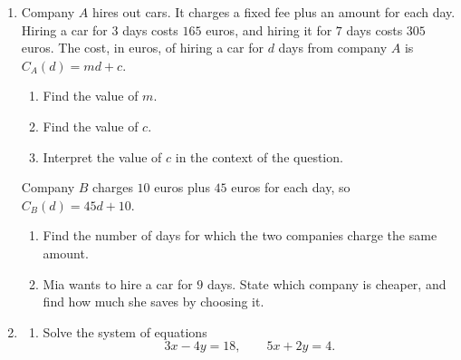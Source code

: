\documentclass[12pt, twoside]{article}
\begin{document}
\begin{enumerate}[itemsep=0.15cm]

\newpage

\item[2.]
Company $A$ hires out cars. It charges a fixed fee plus an amount for each
day. Hiring a car for $3$ days costs $165$ euros, and hiring it for $7$
days costs $305$ euros. The cost, in euros, of hiring a car for $d$ days
from company $A$ is $C_{A}(d) = md + c$.

\begin{enumerate}[itemsep=0.1cm]
  \item Find the value of $m$.
  \item Find the value of $c$.
  \item Interpret the value of $c$ in the context of the question.
\end{enumerate}

Company $B$ charges $10$ euros plus $45$ euros for each day, so
$C_{B}(d) = 45d + 10$.

\begin{enumerate}[itemsep=0.1cm]
  \item[(d)] Find the number of days for which the two companies charge
  the same amount.
  \item[(e)] Mia wants to hire a car for $9$ days. State which company is
  cheaper, and find how much she saves by choosing it.
\end{enumerate}


\newpage

\item[3.]

\begin{enumerate}[itemsep=0.1cm]
  \item Solve the system of equations
  $$3x - 4y = 18, \qquad 5x + 2y = 4.$$
\end{enumerate}


\end{enumerate}
\end{document}
